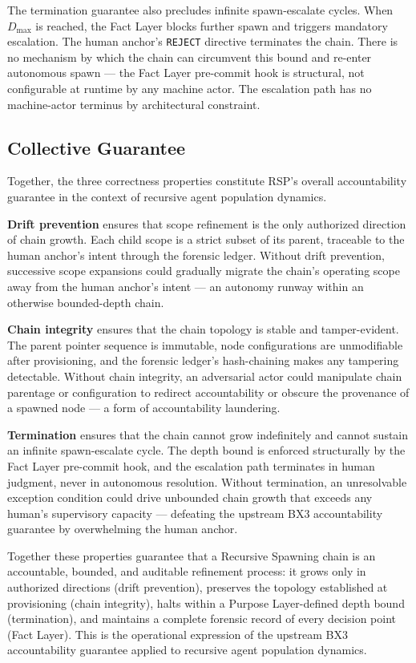 The termination guarantee also precludes infinite spawn-escalate cycles. When $D_{\mathrm{max}}$ is reached, the Fact Layer blocks further spawn and triggers mandatory escalation. The human anchor's \texttt{REJECT} directive terminates the chain. There is no mechanism by which the chain can circumvent this bound and re-enter autonomous spawn — the Fact Layer pre-commit hook is structural, not configurable at runtime by any machine actor. The escalation path has no machine-actor terminus by architectural constraint.

\subsection{Collective Guarantee}
\label{sec:rs-collective-guarantee}

Together, the three correctness properties constitute RSP's overall accountability guarantee in the context of recursive agent population dynamics.

\medskip
\textbf{Drift prevention} ensures that scope refinement is the only authorized direction of chain growth. Each child scope is a strict subset of its parent, traceable to the human anchor's intent through the forensic ledger. Without drift prevention, successive scope expansions could gradually migrate the chain's operating scope away from the human anchor's intent — an autonomy runway within an otherwise bounded-depth chain.

\medskip
\textbf{Chain integrity} ensures that the chain topology is stable and tamper-evident. The parent pointer sequence is immutable, node configurations are unmodifiable after provisioning, and the forensic ledger's hash-chaining makes any tampering detectable. Without chain integrity, an adversarial actor could manipulate chain parentage or configuration to redirect accountability or obscure the provenance of a spawned node — a form of accountability laundering.

\medskip
\textbf{Termination} ensures that the chain cannot grow indefinitely and cannot sustain an infinite spawn-escalate cycle. The depth bound is enforced structurally by the Fact Layer pre-commit hook, and the escalation path terminates in human judgment, never in autonomous resolution. Without termination, an unresolvable exception condition could drive unbounded chain growth that exceeds any human's supervisory capacity — defeating the upstream BX3 accountability guarantee by overwhelming the human anchor.

Together these properties guarantee that a Recursive Spawning chain is an accountable, bounded, and auditable refinement process: it grows only in authorized directions (drift prevention), preserves the topology established at provisioning (chain integrity), halts within a Purpose Layer-defined depth bound (termination), and maintains a complete forensic record of every decision point (Fact Layer). This is the operational expression of the upstream BX3 accountability guarantee applied to recursive agent population dynamics.